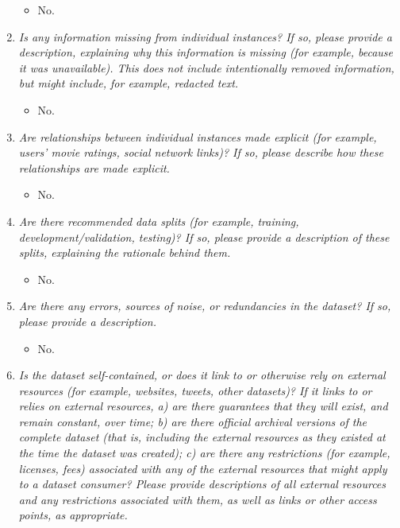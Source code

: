 \documentclass[
]{article}
\providecommand{\tightlist}{%
  \setlength{\itemsep}{0pt}\setlength{\parskip}{0pt}}
\begin{document}
\begin{enumerate}
  \begin{itemize}
  \tightlist
  \item
    No.
  \end{itemize}
\item
  \emph{Is any information missing from individual instances? If so, please provide a description, explaining why this information is missing (for example, because it was unavailable). This does not include intentionally removed information, but might include, for example, redacted text.}

  \begin{itemize}
  \tightlist
  \item
    No.
  \end{itemize}
\item
  \emph{Are relationships between individual instances made explicit (for example, users' movie ratings, social network links)? If so, please describe how these relationships are made explicit.}

  \begin{itemize}
  \tightlist
  \item
    No.
  \end{itemize}
\item
  \emph{Are there recommended data splits (for example, training, development/validation, testing)? If so, please provide a description of these splits, explaining the rationale behind them.}

  \begin{itemize}
  \tightlist
  \item
    No.
  \end{itemize}
\item
  \emph{Are there any errors, sources of noise, or redundancies in the dataset? If so, please provide a description.}

  \begin{itemize}
  \tightlist
  \item
    No.
  \end{itemize}
\item
  \emph{Is the dataset self-contained, or does it link to or otherwise rely on external resources (for example, websites, tweets, other datasets)? If it links to or relies on external resources, a) are there guarantees that they will exist, and remain constant, over time; b) are there official archival versions of the complete dataset (that is, including the external resources as they existed at the time the dataset was created); c) are there any restrictions (for example, licenses, fees) associated with any of the external resources that might apply to a dataset consumer? Please provide descriptions of all external resources and any restrictions associated with them, as well as links or other access points, as appropriate.}


\end{enumerate}
\end{document}
